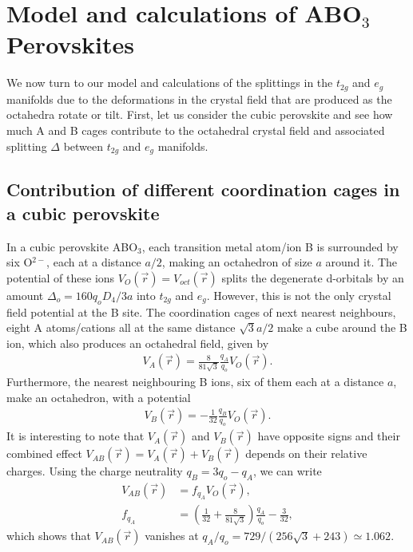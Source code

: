 \documentclass[a4paper,prb,twocolumn]{revtex4-1}  %
\begin{document}
\section{Model and calculations of ABO$_3$ Perovskites}%
\label{sec:calc}

We now turn to our model and calculations of the splittings in the 
$t_{2g}$ and $e_{g}$ manifolds due to the deformations 
in the crystal field that are produced as the octahedra rotate or tilt.
First, let us consider the cubic perovskite and see 
how much A and B cages contribute to the octahedral crystal field and associated splitting $\Delta$ between $t_{2g}$ and $e_{g}$ manifolds.


\subsection{Contribution of different coordination cages in a cubic perovskite}
\label{sec:relativeVoctABO}

In a cubic perovskite ABO$_3$,
each transition metal atom/ion B
is surrounded by six O$^{2-}$, each at a distance $a/2$,
 making an octahedron of size $a$ around it.
The potential of these ions $V_{O}(\vec r)= V_{oct}(\vec r)$
splits the degenerate d-orbitals
by an amount ${\Delta_o=160q_oD_{4}/3a}$
 into $t_{2g}$ and $e_g$.
However, this is not the only crystal field potential at the B site.
The coordination cages of next nearest neighbours, 
eight A atoms/cations all at the same distance $\sqrt{3}a/2$
make a cube around the B ion,
which also produces an octahedral field, given by 
\begin{align}
V_{A}(\vec r) = \frac{8}{81 \sqrt{3}}\frac{q_A}{q_o} V_{O}(\vec r).
\end{align}
Furthermore,
the nearest neighbouring B ions, six of them each at a distance $a$,
make an octahedron, with a potential 
\begin{align}
V_{B}(\vec r) = -\frac{1}{32}\frac{q_B}{q_o}V_{O}(\vec r).
\end{align}
It is interesting to note that 
$V_{A}(\vec r)$ and $V_{B}(\vec r)$ have opposite signs
and 
their combined effect 
$V_{AB}(\vec r) = V_{A}(\vec r)+ V_{B}(\vec r)$
depends on their relative charges.
Using the charge neutrality $q_B=3q_o-q_A$,
we can write 
\begin{align}
V_{AB}(\vec r) &= f_{q_A}V_{O}(\vec r),\\
f_{q_A} &= \left(\frac{1}{32}+\frac{8}{81 \sqrt{3}}\right)\frac{q_A}{q_o} -\frac{3}{32},
\end{align}
which shows that ${V_{AB}(\vec r)}$ vanishes
at
$q_A/q_o=729/({256 \sqrt{3}+243}) {\simeq 1.062}$.
\end{document}
